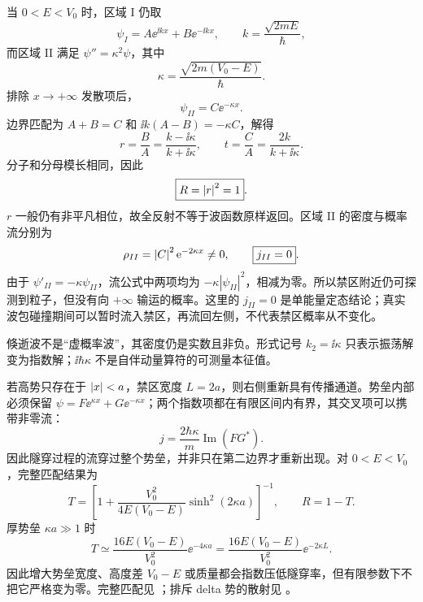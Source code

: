当 $0<E<V_0$ 时，区域 I 仍取
\begin{equation}
  \psi_I=A\ee^{\ii kx}+B\ee^{-\ii kx},
  \qquad
  k=\frac{\sqrt{2mE}}{\hbar},
\end{equation}
而区域 II 满足 $\psi''=\kappa^2\psi$，其中
\begin{equation}
  \kappa=\frac{\sqrt{2m(V_0-E)}}{\hbar}.
  \label{eq:QM-C05-S04-kappa}
\end{equation}
排除 $x\to+\infty$ 发散项后，
\begin{equation}
  \psi_{II}=C\ee^{-\kappa x}.
  \label{eq:QM-C05-S04-evanescent-wave}
\end{equation}
边界匹配为 $A+B=C$ 和 $\ii k(A-B)=-\kappa C$，解得
\begin{equation}
  r=\frac BA=\frac{k-\ii\kappa}{k+\ii\kappa},
  \qquad
  t=\frac CA=\frac{2k}{k+\ii\kappa}.
  \label{eq:QM-C05-S04-below-step-amplitudes}
\end{equation}
分子和分母模长相同，因此
\begin{equation}
  \boxed{R=\left|r\right|^2=1}.
  \label{eq:QM-C05-S04-total-reflection}
\end{equation}
$r$ 一般仍有非平凡相位，故全反射不等于波函数原样返回。区域 II 的密度与概率流分别为
\begin{equation}
  \rho_{II}=\left|C\right|^2\mathrm{e}^{-2\kappa x}\neq0,
  \qquad
  \boxed{j_{II}=0}.
  \label{eq:QM-C05-S04-evanescent-density-current}
\end{equation}
由于 $\psi'_{II}=-\kappa\psi_{II}$，流公式中两项均为 $-\kappa|\psi_{II}|^2$，相减为零。所以禁区附近仍可探测到粒子，但没有向 $+\infty$ 输运的概率。这里的 $j_{II}=0$ 是单能量定态结论；真实波包碰撞期间可以暂时流入禁区，再流回左侧，不代表禁区概率从不变化。

倏逝波不是“虚概率波”，其密度仍是实数且非负。形式记号 $k_2=\ii\kappa$ 只表示振荡解变为指数解；$\ii\hbar\kappa$ 不是自伴动量算符的可测量本征值。

若高势只存在于 $\left|x\right|<a$，禁区宽度 $L=2a$，则右侧重新具有传播通道。势垒内部必须保留 $\psi=F\ee^{\kappa x}+G\ee^{-\kappa x}$；两个指数项都在有限区间内有界，其交叉项可以携带非零流：
\begin{equation}
  j=\frac{2\hbar\kappa}{m}\operatorname{Im}(FG^*).
\end{equation}
因此隧穿过程的流穿过整个势垒，并非只在第二边界才重新出现。对 $0<E<V_0$，完整匹配结果为
\begin{equation}
  \boxed{
  T=
  \left[
    1+\frac{V_0^2}{4E(V_0-E)}
    \sinh^2(2\kappa a)
  \right]^{-1}},
  \qquad
  R=1-T.
  \label{eq:QM-C05-S04-finite-barrier-transmission}
\end{equation}
厚势垒 $\kappa a\gg1$ 时
\begin{equation}
  T\simeq
  \frac{16E(V_0-E)}{V_0^2}
  \ee^{-4\kappa a}
  =\frac{16E(V_0-E)}{V_0^2}
  \ee^{-2\kappa L}.
  \label{eq:QM-C05-S04-thick-barrier}
\end{equation}
因此增大势垒宽度、高度差 $V_0-E$ 或质量都会指数压低隧穿率，但有限参数下不把它严格变为零。完整匹配见
；排斥 delta 势的散射见
。

